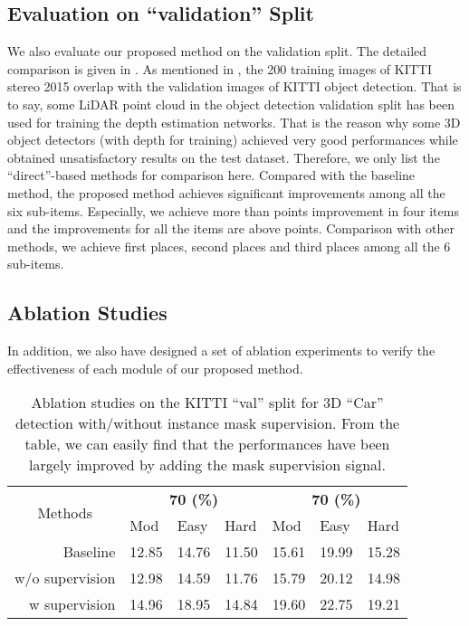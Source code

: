 \subsection{Evaluation on ``validation'' Split}
We also evaluate our proposed method on the validation split. The detailed comparison is given in .  As mentioned in \cite{wang2019pseudo}, the 200 training images of KITTI stereo 2015 overlap with the validation images of KITTI object detection. That is to say, some LiDAR point cloud in the object detection validation split has been used for training the depth estimation networks. That is the reason why some 3D object detectors (with depth for training) achieved very good performances while obtained unsatisfactory results on the test dataset. Therefore, we only list the ``direct''-based methods for comparison here. Compared with the baseline method, the proposed method achieves significant improvements among all the six sub-items. Especially, we achieve more than  points improvement in four items and the improvements for all the items are above  points. Comparison with other methods, we achieve  first places,  second places and  third places among all the 6 sub-items. 



\subsection{Ablation Studies}
In addition, we also have designed a set of ablation experiments to verify the effectiveness of each module of our proposed method. 
\begin{table*}[ht!]
	\centering
	\resizebox{0.5\textwidth}{!}
	{\begin{tabular}{r  ccc ccc}
			\hline
			\multicolumn{1}{c}{\multirow{2}{*}{Methods}}&   \multicolumn{3}{c}{\textbf{70 (\%)}} & \multicolumn{3}{c}{\textbf{70 (\%)}} \\
			\multicolumn{1}{c}{}     & \multicolumn{1}{l}{Mod } & \multicolumn{1}{l}{Easy} & \multicolumn{1}{l}{Hard} & \multicolumn{1}{l}{Mod}  & \multicolumn{1}{l}{Easy} & \multicolumn{1}{l}{Hard}\\ \hline
			Baseline         & 12.85 & 14.76 & 11.50 & 15.61 & 19.99 & 15.28 \\
			w/o supervision & 12.98 & 14.59 & 11.76 &  15.79 &20.12 & 14.98\\  
			w  supervision   & 14.96 & 18.95 & 14.84 & 19.60 & 22.75 & 19.21\\    
\hline 
		\end{tabular}   
	}
	\caption{\normalfont Ablation studies on the KITTI ``val'' split for 3D ``Car'' detection with/without instance mask supervision. From the table, we can easily find that the performances have been largely improved by adding the mask supervision signal.}
	\label{tab:mask_influence}
\end{table*}
